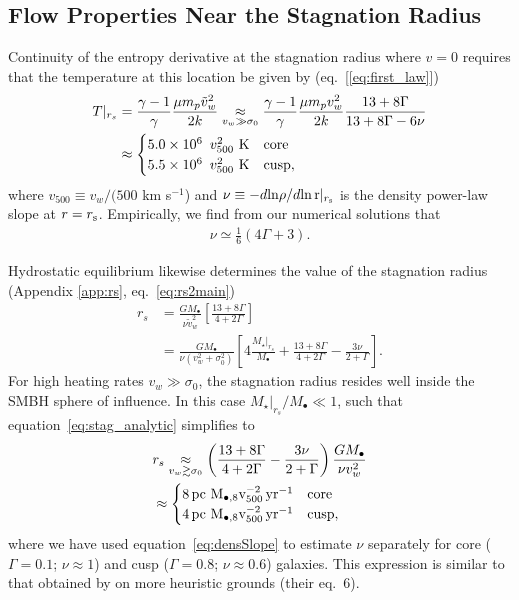 \documentclass[usenatbib,fleqn]{mn2e}
\newcommand{\rs}{r_s}
\newcommand{\vw}{\tilde{v}_{w}}
\newcommand{\pc}{\rm pc}
\newcommand{\Mstar}{M_{\star}}
\newcommand{\Mbh}[1][]{M_{\bullet#1}}
\newcommand{\Mbheight}{M_{\bullet,8}}
\newcommand{\pyear}{{\rm yr}^{-1}}
\newcommand{\densSlope}{\nu}
\begin{document}
\subsection{Flow Properties Near the Stagnation Radius}

Continuity of the entropy derivative at the stagnation radius where $v = 0$ requires that the temperature at this location be given by (eq.~[\ref{eq:first_law}])
\begin{align}
T|_{r_{s}}& = \frac{\gamma-1}{\gamma}\frac{\mu m_p
  \tilde{v}_{w}^{2}}{2k} \underset{v_w \gg \sigma_0}\approx \frac{\gamma-1}{\gamma}\frac{\mu
  m_p v_w^2}{2k} \frac{13+8\Gamma}{13+8\Gamma-6\nu} \nonumber\\ 
 &\approx
 \begin{cases}
  5.0\times 10^6\ \, v_{500}^2 \,\,{\rm K} & \text{core} \\
  5.5\times 10^6\ \, v_{500}^2 \,\,{\rm K} & \text{cusp},
 \end{cases}
\label{eq:Tanalytic}
\end{align}
where $v_{500} \equiv v_{w}/(500$ km s$^{-1}$)  and $\densSlope \equiv -d{\rm ln}\rho/d{\rm ln\,r}|_{r_{\rm s}}$ is the density power-law slope at $r = r_{\rm s}$.
Empirically, we find from our numerical solutions that
\begin{align}
\densSlope \simeq \frac{1}{6} \left(4 \Gamma+3\right).
\label{eq:densSlope}
\end{align}

Hydrostatic equilibrium likewise determines the value of the stagnation radius (Appendix \ref{app:rs}, eq.~\ref{eq:rs2main})
\begin{align}
  \rs&=\frac{G \Mbh}{\densSlope \vw^2}\left[\frac{13+ 8\Gamma}{4+2\Gamma}\right]\nonumber\\
  &=\frac{G \Mbh}{\densSlope (v_w^{2}+\sigma_0^2)}\left[4
    \frac{\Mstar|_{\rs}}{\Mbh} +\frac{13+
      8\Gamma}{4+2\Gamma}- \frac{3\nu}{2+\Gamma}\right]. 
\label{eq:stag_analytic}
\end{align}
For high heating rates $v_w \gg \sigma_0$, the stagnation radius resides well inside the SMBH sphere of influence.  In this case $\Mstar|_{\rs}/\Mbh \ll1$, such that equation~\eqref{eq:stag_analytic} simplifies to
\begin{align}
  &\rs \underset{v_w \gtrsim \sigma_0}\approx
  \left(\frac{13+8\Gamma}{4+2\Gamma}-
    \frac{3\nu}{2+\Gamma}\right)\frac{G \Mbh}{\nu v_w^2}\nonumber\\
  &\approx \begin{cases} 8
    \, \pc \,\, \Mbheight v_{500}^{-2}\, \pyear& \text{core} \\
    4 \, \pc \,\, \Mbheight v_{500}^{-2} \, \pyear & \text{cusp},
  \end{cases}
  \label{eq:stag_simple}
\end{align}
where we have used equation~\eqref{eq:densSlope} to estimate
$\densSlope$ separately for
core ($\Gamma = 0.1$; $\densSlope\approx 1$) and cusp ($\Gamma = 0.8$; $\densSlope \approx 0.6$) galaxies.  This
expression is similar to that obtained by \citet{Volonteri+11} on more
heuristic grounds (their eq.~6). 
\end{document}
